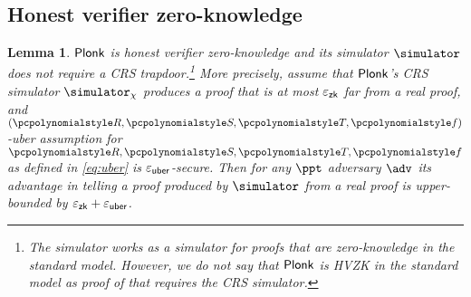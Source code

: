 \let\accentvec\vec \documentclass[runningheads,10pt]{llncs}
\newtheorem{lemma}[theorem]{Lemma}
\begin{document}
\subsection{Honest verifier zero-knowledge}
\begin{lemma}
	$\textnormal{\textsf{Plonk}}$ is honest verifier zero-knowledge and its simulator $\simulator$ does not
	require a CRS trapdoor.\footnote{The simulator works as a simulator for
	proofs that are zero-knowledge in the standard model. However, we do not
say that $\textnormal{\textsf{Plonk}}$ is HVZK in the standard model as proof of that
\emph{requires} the CRS simulator.} More precisely, assume that $\textnormal{\textsf{Plonk}}$'s CRS
simulator $\simulator_\chi$ produces a proof that is at most $\varepsilon_{\mathsf{zk}}$ far from
a real proof, and $(\pR, \pS, \pT, \pf)$-uber assumption for $\pR, \pS, \pT,
\pf$ as defined in \cref{eq:uber} is $\varepsilon_{\mathsf{uber}}$-secure. Then for any $\ppt$
adversary $\adv$ its advantage in telling a proof produced by $\simulator$
from a real proof is upper-bounded by $\varepsilon_{\mathsf{zk}} + \varepsilon_{\mathsf{uber}}$.
\end{lemma}
\end{document}
